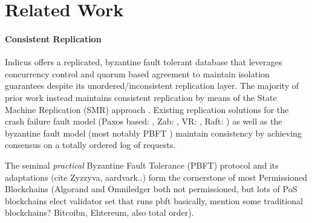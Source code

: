 
\section{Related Work}  

\paragraph{Consistent Replication}
Indicus offers a replicated, byzantine fault tolerant database that leverages concurrency control and quorum based agreement to maintain isolation guarantees despite its unordered/inconsistent replication layer. 
The majority of prior work instead maintains consistent replication by means of the State Machine Replication (SMR) approach \cite{schneider1990implementing}. Existing replication solutions for the crash failure fault model (Paxos based: \cite{Li2007, Lampson2001, Lamport98Paxos, Lamport2005a, Lamport2005, Lamport01Paxos, Chandra2007} , Zab: \cite{junqueira2011zab}, \cite{van2014vive}  VR: \cite{oki1988viewstampeda, liskov2012viewstamped}, Raft: \cite{ongaro2014search}) as well as the byzantine fault model \cite{lamport2011byzantizing, pires2018generalized, Guerraoui08Next, Kotla04High, bessani2014state, liskov2010viewstamped} (most notably PBFT \cite{castro1999practical}) maintain consistency by achieving consensus on a totally ordered log of requests. 

The seminal \textit{practical} Byzantine Fault Tolerance (PBFT) protocol and its adaptations (cite Zyzzyva, aardvark..) form the cornerstone of most Permissioned Blockchains \cite{Hyperledger, EthereumQuorum, buchman2016tendermint, al2017chainspace, kokoris2018omniledger,  gilad2017algorand, baudet2019state} (Algorand and Omniledger both not permissioned, but lots of PoS blockchains elect validator set that runs pbft basically, mention some traditional blockchains? Bitcoibn, Ehtereum, also total order).



